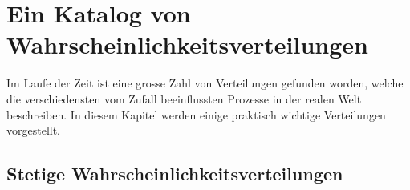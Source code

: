 %
%
%
\chapter{Ein Katalog von Wahrscheinlichkeitsverteilungen} \label{chapter-wahrscheinlichkeitsverteilung-katalog}
Im Laufe der Zeit ist eine grosse Zahl von Verteilungen gefunden worden,
welche die verschiedensten vom Zufall beeinflussten Prozesse in der realen
Welt beschreiben.
In diesem Kapitel werden einige praktisch wichtige Verteilungen vorgestellt.

\section{Stetige Wahrscheinlichkeitsverteilungen}











